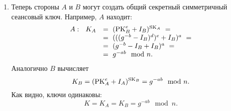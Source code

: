 \begin{enumerate}
    \item Теперь стороны $A$ и $B$ могут создать общий секретный симметричный сеансовый ключ. Например, $A$ находит:
        \[ \begin{array}{ll}
            A: ~~ K_A & = ~ (\textrm{PK}_B^e + I_B)^{\textrm{SK}_A} ~ = \\
                & = ~ (((g^{-b} - I_B)^d)^e + I_B)^a ~ = \\
                & = ~ (g^{-b} - I_B + I_B)^a ~ = \\
                & = ~ g^{-ab} \mod n. \\
        \end{array} \]
        Аналогично $B$ вычисляет
            \[ K_B = (\textrm{PK}_A^e + I_A)^{\textrm{SK}_B} = g^{-ab} \mod n. \]
        Как видно, ключи одинаковы:
            \[ K = K_A = K_B = g^{-ab} \mod n. \]
\end{enumerate}
